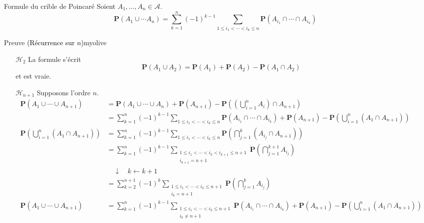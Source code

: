     \begin{prop}{Formule du crible de Poincaré}{}
        Soient $A_1, \ldots, A_n \in \mathcal{A}$. 
        \[ \mathbf{P}(A_1 \cup \cdots A_n) = \sum_{k = 1}^n (-1)^{k - 1} \sum_{1 \leq i_1 < \cdots < i_k \leq n} \mathbf{P}(A_{i_1} \cap \cdots \cap A_{i_k}) \]   
    \end{prop}

    \begin{demo}{Preuve \textcolor{black}{(Récurrence sur $n$)}}{myolive}
        \begin{itemize}
            \item[$\mathcal{H}_2$] \quad La formule s’écrit 
            \[ \mathbf{P}(A_1 \cup A_2) = \mathbf{P}(A_1) + \mathbf{P}(A_2) - \mathbf{P}(A_1 \cap A_2) \]   
            et est vraie.
            \item[$\mathcal{H}_{n + 1}$] \quad Supposons l’ordre $n$. 
            \begin{align*}
                \mathbf{P}(A_1 \cup \cdots \cup A_{n+1}) 
                &= \mathbf{P}(A_1 \cup \cdots \cup A_n) + \mathbf{P}(A_{n + 1}) - \mathbf{P}\left(\left(\bigcup_{i = 1}^n A_i\right) \cap A_{n+1} \right) \\
                &= \sum_{k = 1}^{n} (-1)^{k-1} \sum_{1 \leq i_1 < \cdots < i_k \leq n} \mathbf{P}(A_{i_1} \cap \cdots \cap A_{i_k}) + \mathbf{P}(A_{n+1}) - \mathbf{P}\left(\bigcup_{i = 1}^n (A_1 \cap A_{n + 1})\right) \\
                \mathbf{P}\left(\bigcup_{i = 1}^n (A_1 \cap A_{n + 1})\right) &= \sum_{k=1}^n (-1)^{k-1} \sum_{1 \leq i_1 < \cdots < i_k \leq n} \mathbf{P}\left(\bigcap_{j = 1}^k (A_{i_j} \cap A_{n+1})\right) \\
                &= \sum_{k=1}^n (-1)^{k-1} \sum_{\substack{1 \leq i_1 < \cdots < i_k < i_{k+1} \leq n+1 \\ i_{k+1} = n+1}} \mathbf{P}\left(\bigcap_{j = 1}^{k+1} A_{i_j}\right) \\
                &\quad \downarrow \quad k \leftarrow k+1 \\
                &= \sum_{k = 2}^{n+1} (-1)^k \sum_{\substack{1 \leq i_1 < \cdots < i_k\leq n+1 \\ i_{k} = n+1}} \mathbf{P}\left(\bigcap_{j = 1}^{k} A_{i_j}\right) \\
                \mathbf{P}(A_1 \cup \cdots \cup A_{n+1})
                &= \sum_{k = 1}^{n} (-1)^{k-1} \sum_{\substack{1 \leq i_1 < \cdots < i_k \leq n+1 \\ i_k \neq n+1}} \mathbf{P}(A_{i_1} \cap \cdots \cap A_{i_k}) + \mathbf{P}(A_{n+1}) - \mathbf{P}\left(\bigcup_{i = 1}^n (A_1 \cap A_{n + 1})\right) \\

\end{align*}
\end{itemize}
\end{demo}

